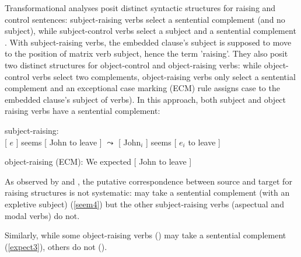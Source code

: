 \documentclass[output=paper
	        ,collection
	        ,collectionchapter
 	        ,biblatex
                ,babelshorthands
                ,newtxmath
                ,draftmode
                ,colorlinks, citecolor=brown
]{./langsci/langscibook}
\begin{document}
Transformational analyses posit distinct syntactic structures for raising and control sentences: subject-raising verbs select a sentential complement (and no subject), while subject-control verbs select a subject and a sentential complement \citep{Postal1974, Chomsky81a}. With subject-raising verbs, the embedded clause's subject is supposed to move to the position of matrix verb subject, hence the  term 'raising'. They also posit two distinct structures for object-control and object-raising verbs: while object-control verbs select two complements, object-raising verbs only select a sentential complement and
an exceptional case marking (ECM) rule assigns case to the embedded clause's subject of  verbs).
In this approach, both subject and object raising verbs have a sentential complement:
	
\begin{exe}
\ex  \begin{xlist}
\ex 	subject-raising:\\
{}[ $e$ ] seems [ John to leave ] 
$\leadsto$  
{}[ John$_{i}$ ] seems [ $e_{i}$ to leave ]	

\ex 	object-raising (ECM): We expected [ John to leave ] 	
 \end{xlist}
 \end{exe}

 As observed by \citet{Bresnan1982} and \citet{SagandPollard1991}, the putative correspondence between source and target for raising structures is not systematic:  may take a sentential complement (with an expletive subject) (\ref{seem4}) but the other subject-raising verbs (aspectual and modal verbs) do not. 


\eal
{}
\zl
 
Similarly, while some object-raising verbs () may take a sentential complement (\ref{expect3}), others do not ().
 
\end{document}
